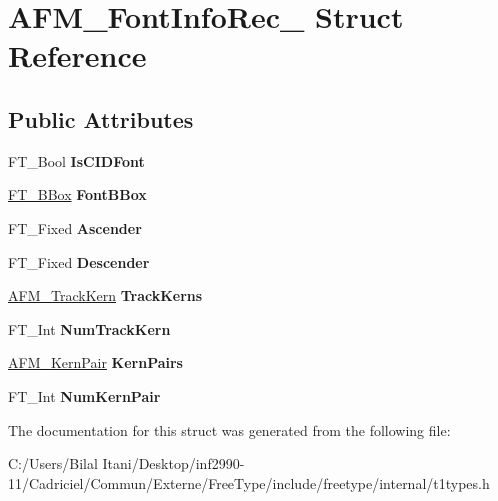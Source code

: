 \hypertarget{struct_a_f_m___font_info_rec__}{}\section{A\+F\+M\+\_\+\+Font\+Info\+Rec\+\_\+ Struct Reference}
\label{struct_a_f_m___font_info_rec__}
\subsection*{Public Attributes}
\begin{DoxyCompactItemize}
\item 
F\+T\+\_\+\+Bool {\bfseries Is\+C\+I\+D\+Font}\hypertarget{struct_a_f_m___font_info_rec___a6f198e74da5d8a3b7ff7518e255be231}{}\label{struct_a_f_m___font_info_rec___a6f198e74da5d8a3b7ff7518e255be231}

\item 
\hyperlink{struct_f_t___b_box__}{F\+T\+\_\+\+B\+Box} {\bfseries Font\+B\+Box}\hypertarget{struct_a_f_m___font_info_rec___afa5112d6b0cc51839889206012dc1be6}{}\label{struct_a_f_m___font_info_rec___afa5112d6b0cc51839889206012dc1be6}

\item 
F\+T\+\_\+\+Fixed {\bfseries Ascender}\hypertarget{struct_a_f_m___font_info_rec___a0b80412562435a2198a71aa4188ee85b}{}\label{struct_a_f_m___font_info_rec___a0b80412562435a2198a71aa4188ee85b}

\item 
F\+T\+\_\+\+Fixed {\bfseries Descender}\hypertarget{struct_a_f_m___font_info_rec___a3561507200f0bc3413988af920924053}{}\label{struct_a_f_m___font_info_rec___a3561507200f0bc3413988af920924053}

\item 
\hyperlink{struct_a_f_m___track_kern_rec__}{A\+F\+M\+\_\+\+Track\+Kern} {\bfseries Track\+Kerns}\hypertarget{struct_a_f_m___font_info_rec___a8d9305229a1dacc15b8fceb5dbf25b9d}{}\label{struct_a_f_m___font_info_rec___a8d9305229a1dacc15b8fceb5dbf25b9d}

\item 
F\+T\+\_\+\+Int {\bfseries Num\+Track\+Kern}\hypertarget{struct_a_f_m___font_info_rec___a08a9207e8d4b0dd9dc0313218462f00e}{}\label{struct_a_f_m___font_info_rec___a08a9207e8d4b0dd9dc0313218462f00e}

\item 
\hyperlink{struct_a_f_m___kern_pair_rec__}{A\+F\+M\+\_\+\+Kern\+Pair} {\bfseries Kern\+Pairs}\hypertarget{struct_a_f_m___font_info_rec___a16c5da5249d4d4f68cc169469f3ee75a}{}\label{struct_a_f_m___font_info_rec___a16c5da5249d4d4f68cc169469f3ee75a}

\item 
F\+T\+\_\+\+Int {\bfseries Num\+Kern\+Pair}\hypertarget{struct_a_f_m___font_info_rec___a8ff8af3c83fbf0b060bb711b57f1affd}{}\label{struct_a_f_m___font_info_rec___a8ff8af3c83fbf0b060bb711b57f1affd}

\end{DoxyCompactItemize}


The documentation for this struct was generated from the following file\+:\begin{DoxyCompactItemize}
\item 
C\+:/\+Users/\+Bilal Itani/\+Desktop/inf2990-\/11/\+Cadriciel/\+Commun/\+Externe/\+Free\+Type/include/freetype/internal/t1types.\+h\end{DoxyCompactItemize}
